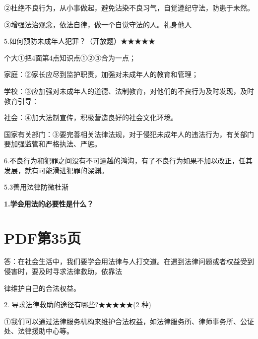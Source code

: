 \documentclass[lang=cn,11pt]{elegantbook}
\newcommand{\daofasym}[1]{{\daofasymbolfont #1}}
\newcommand{\daofasym}[1]{#1}
\begin{document}
\daofasym{②}杜绝不良行为，从小事做起，避免沾染不良习气，自觉遵纪守法，防患于未然。\par

\daofasym{③}增强法治观念，依法自律，做一个自觉守法的人。礼身他人\par

5.如何预防未成年人犯罪？（开放题）\daofasym{★}\daofasym{★}\daofasym{★}\daofasym{★}\daofasym{★}\par

个大\daofasym{①}把4面第4点知识点\daofasym{①}\daofasym{②}\daofasym{③}合为一点；\par

家庭：\daofasym{②}家长应尽到监护职责，加强对未成年人的教育和管理；\par

学校：\daofasym{③}应加强对未成年人的道德、法制教育，对他们的不良行为及时发现，及时教育引导：\par

社会：\daofasym{④}加大法制宣传，积极营造良好的社会文化环境。\par

国家有关部门：\daofasym{③}要完善相关法律法规，对于侵犯未成年人的违法行为，有关部门要加强监管和严格执法、严惩。\par

6.不良行为和犯罪之间没有不可逾越的鸿沟，有了不良行为如果不加以改正，任其发展，就有可能滑进犯罪的深渊。\par

5.3善用法律防微杜渐\par

\textbf{1.学会用法的必要性是什么？}\par


\section*{PDF第35页}

答：在社会生活中，我们要学会用法律与人打交道。在遇到法律问题或者权益受到侵害时，要及时寻求法律救助，依靠法\par

律维护自己的合法权益。\par

2. 导求法律救助的途径有哪些?\daofasym{★}\daofasym{★}\daofasym{★}\daofasym{★}\daofasym{★}(2 种)\par

\daofasym{①}我们可以通过法律服务机构来维护合法权益，如法律服务所、律师事务所、公证处、法律援助中心等。\par
\end{document}
